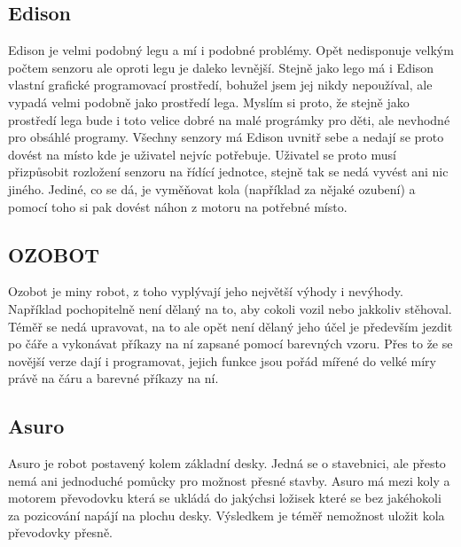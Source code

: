 \documentclass{template/socthesis}
\begin{document}
\subsection{Edison}
Edison je velmi podobný legu a mí i podobné problémy. Opět nedisponuje velkým počtem senzoru ale oproti legu je daleko levnější. Stejně jako lego má i Edison vlastní grafické programovací prostředí, bohužel jsem jej nikdy nepoužíval, ale vypadá velmi podobně jako prostředí lega. Myslím si proto, že stejně jako prostředí lega bude i toto velice dobré na malé prográmky pro děti, ale nevhodné pro obsáhlé programy.
Všechny senzory má Edison uvnitř sebe a nedají se proto dovést na místo kde je uživatel nejvíc potřebuje. Uživatel se proto musí přizpůsobit rozložení senzoru na řídící jednotce, stejně tak se nedá vyvést ani nic jiného. Jediné, co se dá, je vyměňovat kola (například za nějaké ozubení) a pomocí toho si pak dovést náhon z motoru na potřebné místo.

\subsection{OZOBOT}
Ozobot je miny robot, z toho vyplývají jeho největší výhody i nevýhody. Například pochopitelně není dělaný na to, aby cokoli vozil nebo jakkoliv stěhoval. Téměř se nedá upravovat, na to ale opět není dělaný jeho účel je především jezdit po čáře a vykonávat příkazy na ní zapsané pomocí barevných vzoru. Přes to že se novější verze dají i programovat, jejich funkce jsou pořád mířené do velké míry právě na čáru a barevné příkazy na ní.

\subsection{Asuro}
Asuro je robot postavený kolem základní desky. Jedná se o stavebnici, ale přesto nemá ani jednoduché pomůcky pro možnost přesné stavby. Asuro má mezi koly a motorem převodovku která se ukládá do jakýchsi ložisek které se bez jakéhokoli za pozicování napájí na plochu desky. Výsledkem je téměř nemožnost uložit kola převodovky přesně.
\end{document}

